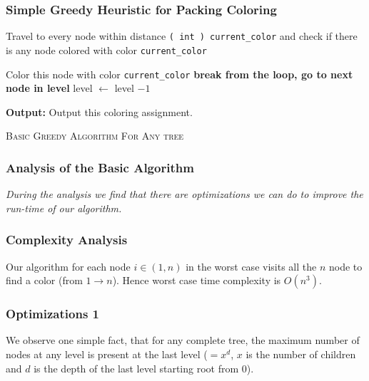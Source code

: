 \begin{frame}
    \frametitle{Simple Greedy Heuristic for Packing Coloring}

    \begin{algorithm}[H]
    
            Travel to every node within distance \texttt{( int ) current\_color} and check if there is any node
            colored with color \texttt{current\_color}\;

             {
                Color this node with color \texttt{current\_color}\;
                \textbf{break from the loop, go to next node in level}\;
            }
            \textsf{level} $\gets$ \textsf{level} $-1$\;
    
        \textbf{Output:} Output this coloring assignment.
    
        \caption{\textsc{Basic Greedy Algorithm For Any tree}}
    \end{algorithm}

\end{frame}

\begin{frame}
    \frametitle{Analysis of the Basic Algorithm}

    \textit{During the analysis we find that there are optimizations we can do to improve the run-time of our algorithm.}

\end{frame}


\begin{frame}
    \frametitle{Complexity Analysis}

    Our algorithm for each node $i \in (1, n)$ in the worst case visits all the $n$ node to find a color (from $1 \to n$). Hence worst case time complexity is $O(n^3)$.

\end{frame}

\begin{frame}
    \frametitle{Optimizations 1}

    We observe one simple fact, that for any complete tree, the maximum number of nodes at any level is present at the last level ($=x^d$, $x$ is the number of children and $d$ is the depth of the last level starting root from $0$).    

\end{frame}


